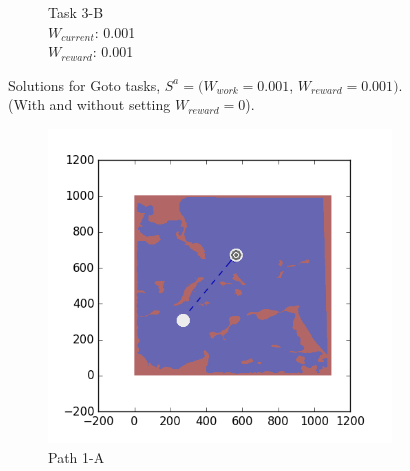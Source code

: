 \documentclass{tamuccthesis}
\begin{document}
\begin{figure}[H]
\begin{subfigure}[b]{0.24\textwidth}
        \caption{{\small Task 3-B \\ $W_{current}$: 0.001 \\ $W_{reward}$: 0.001}}   
        \label{fig:Path_3-B_upCurrent_Reward}
    \end{subfigure}
    \caption[Solutions for Goto tasks using weights $S^a$.]{Solutions for Goto tasks, $S^a = (W_{work} = 0.001$, $W_{reward} = 0.001)$. \\ (With and without setting $W_{reward} = 0$).}
    \label{fig:weights_Sa}
\end{figure}

\begin{figure}[H]
    \centering
    \begin{subfigure}[b]{0.24\textwidth}
        \centering
            \includegraphics[width=\textwidth,trim={4cm 3cm 2cm 3cm},clip]{EXP3RG_PathAa_-1_-1_0d01_0d005.png}
        \caption{Path 1-A }    
        \label{fig:Path_1-A_upReward_upWork_b}
    \end{subfigure}
    \begin{subfigure}[b]{0.24\textwidth}  
        \centering 

\end{subfigure}
\end{figure}
\end{document}
